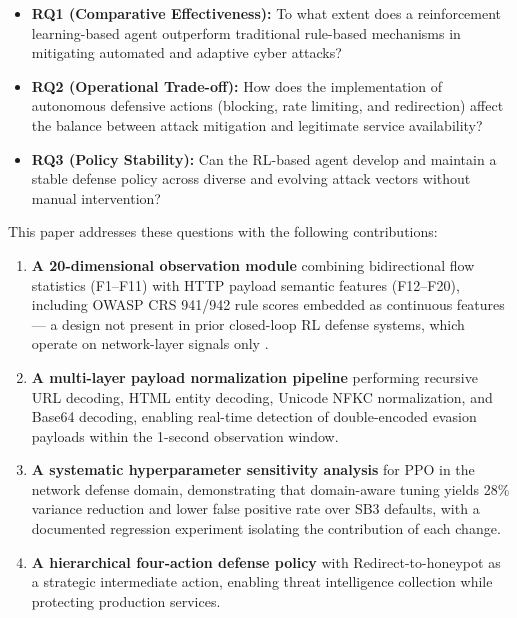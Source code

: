 \documentclass[conference]{IEEEtran}
\begin{document}
\begin{itemize}
  \item \textbf{RQ1 (Comparative Effectiveness):} To what extent does a
    reinforcement learning-based agent outperform traditional rule-based
    mechanisms in mitigating automated and adaptive cyber attacks?

  \item \textbf{RQ2 (Operational Trade-off):} How does the implementation
    of autonomous defensive actions (blocking, rate limiting, and
    redirection) affect the balance between attack mitigation and
    legitimate service availability?

  \item \textbf{RQ3 (Policy Stability):} Can the RL-based agent develop
    and maintain a stable defense policy across diverse and evolving
    attack vectors without manual intervention?
\end{itemize}

This paper addresses these questions with the following contributions:

\begin{enumerate}
  \item \textbf{A 20-dimensional observation module} combining bidirectional
    flow statistics (F1--F11) with HTTP payload semantic features (F12--F20),
    including OWASP CRS 941/942 rule scores embedded as continuous
    features --- a design not present in prior closed-loop RL defense systems,
    which operate on network-layer signals only \cite{hammar2024tnsm}.

  \item \textbf{A multi-layer payload normalization pipeline} performing
    recursive URL decoding, HTML entity decoding, Unicode NFKC normalization,
    and Base64 decoding, enabling real-time detection of double-encoded
    evasion payloads within the 1-second observation window.

  \item \textbf{A systematic hyperparameter sensitivity analysis} for PPO in
    the network defense domain, demonstrating that domain-aware tuning
    yields 28\% variance reduction and lower false positive rate over
    SB3 defaults, with a documented regression experiment isolating
    the contribution of each change.

  \item \textbf{A hierarchical four-action defense policy} with
    Redirect-to-honeypot as a strategic intermediate action, enabling
    threat intelligence collection while protecting production services.
\end{enumerate}
\end{document}

